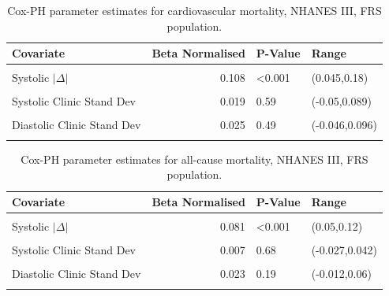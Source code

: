 \documentclass[
]{article}
\begin{document}
\begin{table}[!h]
\centering
\caption{\label{tab:freqCVDF}Cox-PH parameter estimates for cardiovascular mortality, NHANES III, FRS population.}
\centering
\begin{tabular}[t]{lrll}
\toprule
Covariate & Beta Normalised & P-Value & Range\\
\midrule
\cellcolor{gray!10}{FRS (1998)} & \cellcolor{gray!10}{0.512} & \cellcolor{gray!10}{<0.001} & \cellcolor{gray!10}{(0.34,0.67)}\\
Systolic $|\Delta|$ & 0.108 & <0.001 & (0.045,0.18)\\
\cellcolor{gray!10}{Diastolic $|\Delta|$} & \cellcolor{gray!10}{0.102} & \cellcolor{gray!10}{0.0057} & \cellcolor{gray!10}{(0.029,0.18)}\\
Systolic Clinic Stand Dev & 0.019 & 0.59 & (-0.05,0.089)\\
\cellcolor{gray!10}{Systolic Home Stand Dev} & \cellcolor{gray!10}{0.060} & \cellcolor{gray!10}{0.085} & \cellcolor{gray!10}{(-0.0082,0.13)}\\
Diastolic Clinic Stand Dev & 0.025 & 0.49 & (-0.046,0.096)\\
\cellcolor{gray!10}{Diastolic Home Stand Dev} & \cellcolor{gray!10}{0.028} & \cellcolor{gray!10}{0.46} & \cellcolor{gray!10}{(-0.045,0.1)}\\
\bottomrule
\end{tabular}
\end{table}

\begin{table}[!h]
\centering
\caption{\label{tab:freqALLF}Cox-PH parameter estimates for all-cause mortality, NHANES III, FRS population.}
\centering
\begin{tabular}[t]{lrll}
\toprule
Covariate & Beta Normalised & P-Value & Range\\
\midrule
\cellcolor{gray!10}{FRS (1998)} & \cellcolor{gray!10}{0.223} & \cellcolor{gray!10}{<0.001} & \cellcolor{gray!10}{(0.14,0.3)}\\
Systolic $|\Delta|$ & 0.081 & <0.001 & (0.05,0.12)\\
\cellcolor{gray!10}{Diastolic $|\Delta|$} & \cellcolor{gray!10}{0.067} & \cellcolor{gray!10}{<0.001} & \cellcolor{gray!10}{(0.032,0.11)}\\
Systolic Clinic Stand Dev & 0.007 & 0.68 & (-0.027,0.042)\\
\cellcolor{gray!10}{Systolic Home Stand Dev} & \cellcolor{gray!10}{0.017} & \cellcolor{gray!10}{0.35} & \cellcolor{gray!10}{(-0.019,0.054)}\\
Diastolic Clinic Stand Dev & 0.023 & 0.19 & (-0.012,0.06)\\
\cellcolor{gray!10}{Diastolic Home Stand Dev} & \cellcolor{gray!10}{0.012} & \cellcolor{gray!10}{0.54} & \cellcolor{gray!10}{(-0.027,0.05)}\\
\bottomrule
\end{tabular}
\end{table}
\end{document}
